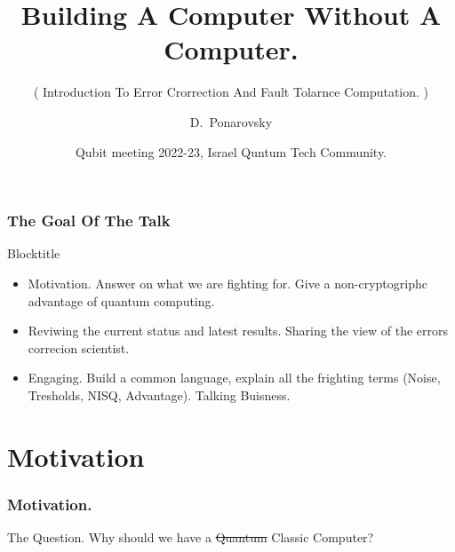 \documentclass{beamer}
\title[Building A Computer Without A Computer] %
{Building A Computer Without A Computer.}
\subtitle{ ( Introduction To Error Crorrection And Fault Tolarnce Computation. ) }
\author[D.~Ponarovsky] %
	{D.~Ponarovsky\inst{1}}
\institute[HUJI] %
	{ \inst{1} Faculty of Computer Science\newline
	  Hebrew University of Jerusalem
	}
\date[2022-23] %
{Qubit meeting 2022-23, Israel Quntum Tech Community.}
\begin{document}

     \begin{frame}
     \maketitle
   \end{frame}

   \begin{frame}
     \frametitle{ The Goal Of The Talk  }

   \begin{exampleblock}{ Blocktitle } 
     \begin{itemize}
       \item<1-> Motivation. Answer on what we are fighting for. Give a non-cryptogriphc advantage of quantum computing.  
       \item<2-> Reviwing the current status and latest results. Sharing the view of the errors correcion scientist.    
       \item<3-> Engaging. Build a common language, explain all the frighting terms (Noise, Tresholds, NISQ, Advantage). Talking Buisness. 
    \end{itemize}
  \end{exampleblock}
   \end{frame}
	\section{Motivation}
	\begin{frame}
	\frametitle{Motivation.}
	 
	\begin{exampleblock}{The Question.}
	    Why should we have a  \only<2> {\sout{Quantum} Classic} Computer?
	  \end{exampleblock}
     
	\end{frame}
\usebackgroundtemplate{ }    %
\end{document}
